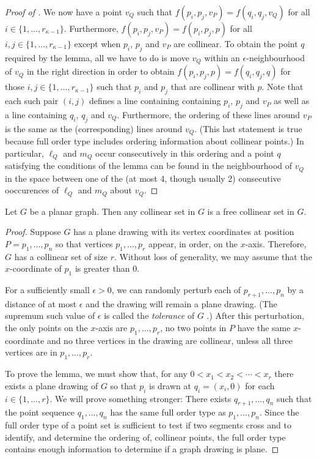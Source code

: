 \documentclass{patmorin}
\begin{document}
\begin{enumerate}
\begin{proof}[Proof of ]
   We now have a point $v_Q$ such that $f(p_i,p_j,v_P)=f(q_i,q_j,v_Q)$
   for all $i\in \{1,\ldots,r_{\kappa-1}\}$.  Furthermore,
   $f(p_i,p_j,v_P)=f(p_i,p_j,p)$ for all $i,j\in
   \{1,\ldots,r_{\kappa-1}\}$ except when $p_i$, $p_j$ and $v_P$ are
   collinear.  To obtain the point $q$ required by the lemma, all we
   have to do is move $v_Q$ within an $\epsilon$-neighbourhood of $v_Q$
   in the right direction in order to obtain $f(p_i,p_j,p)=f(q_i,q_j,q)$
   for those $i,j\in\{1,\ldots,r_{\kappa-1}\}$ such that $p_i$ and
   $p_j$ that are collinear with $p$.  Note that each such pair $(i,j)$
   defines a line containing containing $p_i$, $p_j$ and $v_P$ as well as
   a line containing $q_i$, $q_j$ and $v_Q$.  Furthermore, the ordering
   of these lines around $v_P$ is the same as the (corresponding) lines
   around $v_Q$.  (This last statement is true because full order type
   includes ordering information about collinear points.)  In particular,
   $\ell_Q$ and $m_Q$ occur consecutively in this ordering and a point $q$
   satisfying the conditions of the lemma can be found in the neighbourhood
   of $v_Q$ in the space between one of the (at most 4, though usually 2)
   consecutive ooccurences of $\ell_Q$ and $m_Q$ about $v_Q$.
\end{proof}

\begin{lem}
   Let $G$ be a planar graph.  Then any collinear set in $G$ is a free
   collinear set in $G$.
\end{lem}

\begin{proof}
   Suppose $G$ has a plane drawing with its vertex coordinates at position
   $P=p_1,\ldots,p_n$ so that vertices $p_1,\ldots,p_r$ appear, in order,
   on the $x$-axis.  Therefore, $G$ has a collinear set of size $r$.
   Without loss of generality, we may assume that the $x$-coordinate of
   $p_1$ is greater than 0.

   For a sufficiently small $\epsilon>0$, we can randomly perturb each
   of $p_{r+1},\ldots,p_n$ by a distance of at most $\epsilon$ and
   the drawing will remain a plane drawing. (The supremum such value of
   $\epsilon$ is called the \emph{tolerance} of $G$ \cite{X}.)  After this
   perturbation, the only points on the $x$-axis are $p_1,\ldots,p_r$,
   no two points in $P$ have the same $x$-coordinate and no three
   vertices in the drawing are collinear, unless all three vertices are
   in $p_1,\ldots,p_r$.

   To prove the lemma, we must show that, for any $0<x_1<x_2<\cdots<x_r$
   there exists a plane drawing of $G$ so that $p_i$ is drawn at
   $q_i=(x_i,0)$ for each $i\in\{1,\ldots,r\}$.  We will prove
   something stronger: There exists $q_{r+1},\ldots,q_n$ such that
   the point sequence $q_1,\ldots,q_n$ has the same full order type
   as $p_1,\ldots,p_n$. Since the full order type of a point set
   is sufficient to test if two segments cross and to identify, and
   determine the ordering of, collinear points, the full order type
   contains enough information to determine if a graph drawing is plane.


\end{proof}
\end{enumerate}
\end{document}
